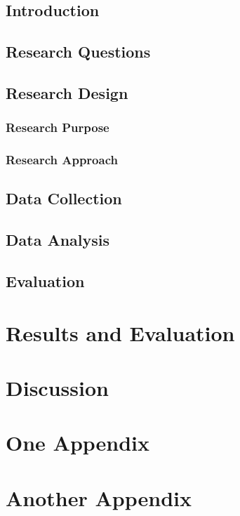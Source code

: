 \documentclass[12pt,a4paper]{report}
\begin{document}
\section{Introduction}
\section{Research Questions}
\section{Research Design}
\subsection{Research Purpose}
\subsection{Research Approach}
\section{Data Collection}
\section{Data Analysis}
\section{Evaluation}

\chapter{Results and Evaluation}

\chapter{Discussion}

\begin{thebibliography}{00}

\end{thebibliography}

\newpage

\begin{appendices}
\chapter{One Appendix}
\chapter{Another Appendix}
\end{appendices}
\end{document}
